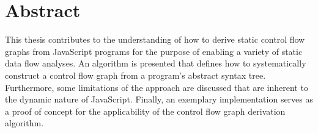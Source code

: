 \newpage
\thispagestyle{empty}
\section*{Abstract}

 This thesis contributes to the understanding of how to derive static control flow graphs from JavaScript programs for the purpose of enabling a variety of static data flow analyses. An algorithm is presented that defines how to systematically construct a control flow graph from a program's abstract syntax tree. Furthermore, some limitations of the approach are discussed that are inherent to the dynamic nature of JavaScript. Finally, an exemplary implementation serves as a proof of concept for the applicability of the control flow graph derivation algorithm.
 